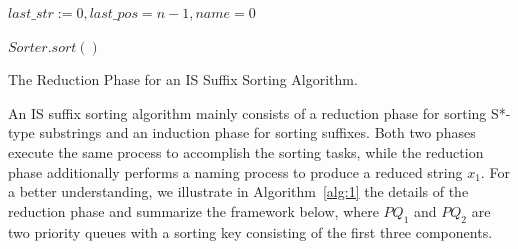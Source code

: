 \documentclass[10pt,journal,compsoc]{IEEEtran}
\begin{document}
\begin{algorithm*}
	
	$last\_str := 0, last\_pos = n - 1, name = 0$ \label{alg1:7}
	
	 \label{alg1:8}
	
	$Sorter.sort()$  \label{alg1:9}
	
	 \label{alg1:10}
	
	
	\caption{The Reduction Phase for an IS Suffix Sorting Algorithm.}
	
	\label{alg:1}
\end{algorithm*}

An IS suffix sorting algorithm mainly consists of a reduction phase for sorting S*-type substrings and an induction phase for sorting suffixes. Both two phases execute the same process to accomplish the sorting tasks, while the reduction phase additionally performs a naming process to produce a reduced string $x_1$. For a better understanding, we illustrate in Algorithm~\ref{alg:1} the details of the reduction phase and summarize the framework below, where $PQ_1$ and $PQ_2$ are two priority queues with a sorting key consisting of the first three components. 
\end{document}
